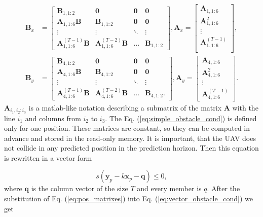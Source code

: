 \documentclass[a4paper,11pt,titlepage]{article}
\begin{document}
\begin{equation}
\begin{split}
\textbf{B}_x &= 
\begin{bmatrix}
\textbf{B}_{1, 1:2} & \textbf{0} & \textbf{0} & \textbf{0} \\
\textbf{A}_{1, 1:6}\textbf{B} & \textbf{B}_{1, 1:2} & \textbf{0} & \textbf{0} \\
\vdots & \vdots & \ddots & \vdots \\
\textbf{A}^{(T-1)}_{1, 1:6}\textbf{B} & \textbf{A}^{(T-2)}_{1, 1:6}\textbf{B} & \hdots & \textbf{B}_{1, 1:2}
\end{bmatrix}, 
\textbf{A}_x = 
\begin{bmatrix}
\textbf{A}_{1, 1:6} \\
\textbf{A}^2_{1, 1:6} \\
\vdots \\
\textbf{A}^{(T-1)}_{1, 1:6} \\
\end{bmatrix}, \\
\textbf{B}_y &= 
\begin{bmatrix}
\textbf{B}_{4, 1:2} & \textbf{0} & \textbf{0} & \textbf{0} \\
\textbf{A}_{4, 1:6}\textbf{B} & \textbf{B}_{4, 1:2} & \textbf{0} & \textbf{0} \\
\vdots & \vdots & \ddots & \vdots \\
\textbf{A}^{(T-1)}_{4, 1:6}\textbf{B} & \textbf{A}^{(T-2)}_{4, 1:6}\textbf{B} & \hdots & \textbf{B}_{4, 1:2}.
\end{bmatrix},
\textbf{A}_y = 
\begin{bmatrix}
\textbf{A}_{4, 1:6} \\
\textbf{A}^2_{4, 1:6} \\
\vdots \\
\textbf{A}^{(T-1)}_{4, 1:6}
\end{bmatrix}.
\end{split}
\end{equation}
$\textbf{A}_{i_1, i_2:i_3}$ is a matlab-like notation describing a submatrix of the matrix $\textbf{A}$ with the line $i_1$ and columns from $i_2$ to $i_3$. The Eq. (\ref{eq:simple_obstacle_cond}) is defined only for one position. These matrices are constant, so they can be computed in advance and stored in the read-only memory. It is important, that the UAV does not collide in any predicted position in the prediction horizon. Then this equation is rewritten in a vector form

\begin{equation}
\label{eq:vector_obstacle_cond}
s(\textbf{y}_p - k\textbf{x}_p - \textbf{q}) \leq 0,
\end{equation}
where $\textbf{q}$ is the column vector of the size $T$ and every member is $q$.
 After the substitution of Eq. (\ref{eq:pos_matrixes}) into Eq. (\ref{eq:vector_obstacle_cond}) we get
 
\end{document}
